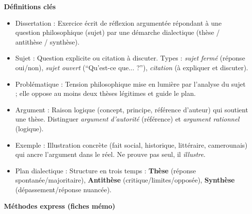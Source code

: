 \documentclass[11pt]{article}
\newcommand{\cle}[1]{{\popxbold\color{popdark}#1}}
\begin{document}
\begin{bilan}

\textbf{Définitions clés}
\begin{itemize}
  \item \cle{Dissertation} : Exercice écrit de réflexion argumentée répondant à une question philosophique (sujet) par une démarche dialectique (thèse / antithèse / synthèse).
  \item \cle{Sujet} : Question explicite ou citation à discuter. Types : \emph{sujet fermé} (réponse oui/non), \emph{sujet ouvert} (``Qu'est-ce que... ?''), \emph{citation} (à expliquer et discuter).
  \item \cle{Problématique} : Tension philosophique mise en lumière par l'analyse du sujet ; elle oppose au moins deux thèses légitimes et guide le plan.
  \item \cle{Argument} : Raison logique (concept, principe, référence d'auteur) qui soutient une thèse. Distinguer \emph{argument d'autorité} (référence) et \emph{argument rationnel} (logique).
  \item \cle{Exemple} : Illustration concrète (fait social, historique, littéraire, camerounais) qui ancre l'argument dans le réel. Ne prouve pas seul, il \emph{illustre}.
  \item \cle{Plan dialectique} : Structure en trois temps : \textbf{Thèse} (réponse spontanée/majoritaire), \textbf{Antithèse} (critique/limites/opposée), \textbf{Synthèse} (dépassement/réponse nuancée).
\end{itemize}

\textbf{Méthodes express (fiches mémo)}


\end{bilan}
\end{document}
